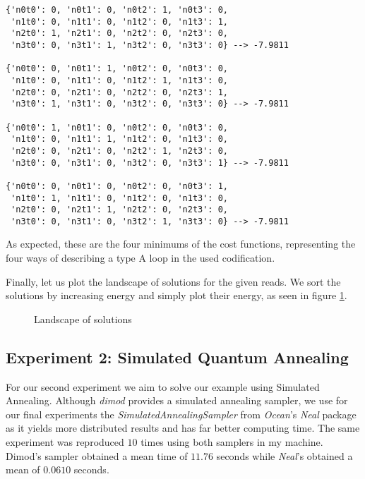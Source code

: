\begin{verbatim}
{'n0t0': 0, 'n0t1': 0, 'n0t2': 1, 'n0t3': 0,
 'n1t0': 0, 'n1t1': 0, 'n1t2': 0, 'n1t3': 1,
 'n2t0': 1, 'n2t1': 0, 'n2t2': 0, 'n2t3': 0,
 'n3t0': 0, 'n3t1': 1, 'n3t2': 0, 'n3t3': 0} --> -7.9811

{'n0t0': 0, 'n0t1': 1, 'n0t2': 0, 'n0t3': 0,
 'n1t0': 0, 'n1t1': 0, 'n1t2': 1, 'n1t3': 0, 
 'n2t0': 0, 'n2t1': 0, 'n2t2': 0, 'n2t3': 1, 
 'n3t0': 1, 'n3t1': 0, 'n3t2': 0, 'n3t3': 0} --> -7.9811

{'n0t0': 1, 'n0t1': 0, 'n0t2': 0, 'n0t3': 0,
 'n1t0': 0, 'n1t1': 1, 'n1t2': 0, 'n1t3': 0, 
 'n2t0': 0, 'n2t1': 0, 'n2t2': 1, 'n2t3': 0, 
 'n3t0': 0, 'n3t1': 0, 'n3t2': 0, 'n3t3': 1} --> -7.9811

{'n0t0': 0, 'n0t1': 0, 'n0t2': 0, 'n0t3': 1,
 'n1t0': 1, 'n1t1': 0, 'n1t2': 0, 'n1t3': 0,
 'n2t0': 0, 'n2t1': 1, 'n2t2': 0, 'n2t3': 0,
 'n3t0': 0, 'n3t1': 0, 'n3t2': 1, 'n3t3': 0} --> -7.9811
\end{verbatim}

As expected, these are the four minimums of the cost functions, representing the four ways of describing a type A loop in the used codification.

Finally, let us plot the landscape of solutions for the given reads. We sort the solutions by increasing energy and simply plot their energy, as seen in figure \ref{fig:exp1-landscape}.

\begin{figure}[H]
	\centering
	\caption{Landscape of solutions}
	\label{fig:exp1-landscape}
\end{figure}


\subsection{Experiment 2: Simulated Quantum Annealing}


For our second experiment we aim to solve our example using Simulated Annealing. Although \emph{dimod} provides a simulated annealing sampler, we use for our final experiments the  \emph{SimulatedAnnealingSampler} from \emph{Ocean}'s \emph{Neal} package as it yields more distributed results and has far better computing time. The same experiment was reproduced $10$ times using both samplers in my machine. Dimod's sampler obtained a mean time of $11.76$ seconds while \emph{Neal}'s obtained a mean of $0.0610$ seconds.

